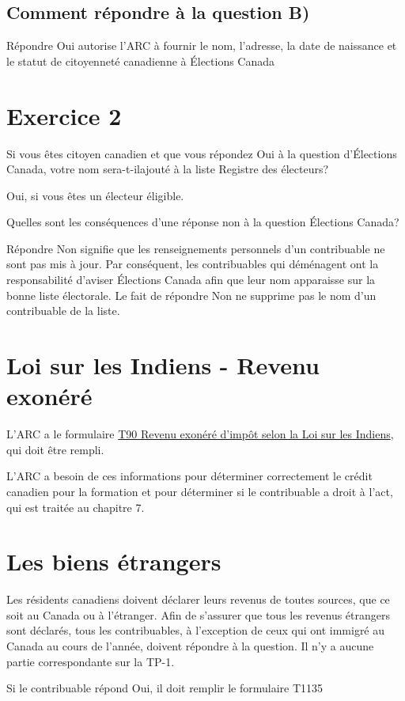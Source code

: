 \subsection{Comment répondre à la question B)}
Répondre \og Oui\fg{} autorise l'ARC à fournir le nom, l'adresse, la date de naissance et le statut de citoyenneté canadienne à Élections Canada



\section{Exercice 2}
\setcounter{question}{0}
\begin{question}
	Si vous êtes citoyen canadien et que vous répondez \og Oui\fg{} à la question d'Élections Canada, votre nom sera-t-ilajouté à la liste Registre des électeurs?
\end{question}
Oui, si vous êtes un électeur éligible.

\begin{question}
	Quelles sont les conséquences d'une réponse \og non\fg{} à la question Élections Canada?
\end{question}
Répondre \og Non\fg{} signifie que les renseignements personnels d'un contribuable ne sont pas mis à jour. Par conséquent, les contribuables qui déménagent ont la responsabilité d'aviser Élections Canada afin que leur nom apparaisse sur la bonne liste électorale. Le fait de répondre \og Non\fg{} ne supprime pas le nom d'un contribuable de la liste.



\section{Loi sur les Indiens - Revenu exonéré}
\begin{intro}
	L'ARC a le formulaire \href{https://www.canada.ca/fr/agence-revenu/services/formulaires-publications/formulaires/t90.html}{T90 Revenu exonéré d'impôt selon la Loi sur les Indiens}, qui doit être rempli.
\end{intro}

\begin{note}
	L'ARC a besoin de ces informations pour déterminer correctement le crédit canadien pour la formation et pour déterminer si le contribuable a droit à l'\acrfull{act}, qui est traitée au chapitre 7.
\end{note}



\section{Les biens étrangers}
\ca
\begin{intro}
	Les résidents canadiens doivent déclarer leurs revenus de toutes sources, que ce soit au Canada ou à l'étranger. Afin de s'assurer que tous les revenus étrangers sont déclarés, tous les contribuables, à l'exception de ceux qui ont immigré au Canada au cours de l'année, doivent répondre à la question. Il n'y a aucune partie correspondante sur la TP-1.
\end{intro}
Si le contribuable répond \og Oui\fg{}, il doit remplir le formulaire T1135


